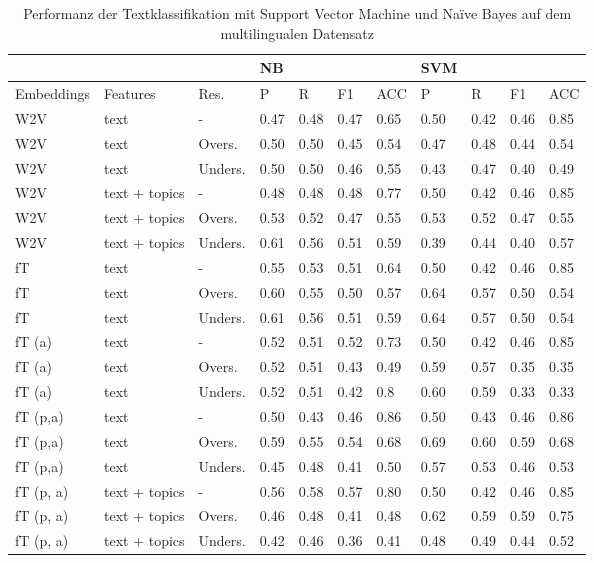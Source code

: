 \documentclass[ngerman]{ttlab-qualify}
\begin{document}
\newpage
\begin{table}[!ht]
    \centering
    \caption{Performanz der Textklassifikation mit Support Vector Machine und Naïve Bayes auf dem multilingualen Datensatz}
    \begin{tabular}{|l|l|l|l|l|l|l|l|l|l|l|}
    \hline
        \textbf{} & \textbf{} & \textbf{} & \textbf{NB} & \textbf{} & \textbf{} & \textbf{} & \textbf{SVM} & \textbf{} & \textbf{} & \textbf{} \\ \hline
        Embeddings & Features & Res. & P & R & F1 & ACC & P & R & F1 & ACC \\ \hline
        W2V  & text  &   - & 0.47 & 0.48 & 0.47 & 0.65 & 0.50 & 0.42 & 0.46 & 0.85 \\ \hline
        W2V  & text  & Overs. & 0.50 & 0.50 & 0.45 & 0.54 & 0.47 & 0.48 & 0.44 & 0.54 \\ \hline
        W2V  & text  & Unders. & 0.50 & 0.50 & 0.46 & 0.55 & 0.43 & 0.47 & 0.40 & 0.49 \\ \hline
        W2V  & text + topics &   - & 0.48 & 0.48 & 0.48 & 0.77 & 0.50 & 0.42 & 0.46 & 0.85 \\ \hline
        W2V  & text + topics & Overs. & 0.53 & 0.52 & 0.47 & 0.55 & 0.53 & 0.52 & 0.47 & 0.55 \\ \hline
        W2V   & text + topics & Unders. & 0.61 & 0.56 & 0.51 & 0.59 & 0.39 & 0.44 & 0.40 & 0.57 \\ \hline
        fT  & text  &   - & 0.55 & 0.53 & 0.51 & 0.64 & 0.50 & 0.42 & 0.46 & 0.85 \\ \hline
        fT  & text  & Overs. & 0.60 & 0.55 & 0.50 & 0.57 & 0.64 & 0.57 & 0.50 & 0.54 \\ \hline
        fT  & text  & Unders. & 0.61 & 0.56 & 0.51 & 0.59 & 0.64 & 0.57 & 0.50 & 0.54 \\ \hline
        fT (a) & text  &   - & 0.52 & 0.51 & 0.52 & 0.73 & 0.50 & 0.42 & 0.46 & 0.85 \\ \hline
        fT  (a) & text  & Overs. & 0.52 & 0.51 & 0.43 & 0.49 & 0.59 & 0.57 & 0.35 & 0.35 \\ \hline
        fT  (a) & text  & Unders. & 0.52 & 0.51 & 0.42 & 0.8 & 0.60 & 0.59 & 0.33 & 0.33 \\ \hline
        fT (p,a) & text  &   - & 0.50 & 0.43 & 0.46 & 0.86 & 0.50 & 0.43 & 0.46 & 0.86 \\ \hline
        fT (p,a) & text  & Overs. & 0.59 & 0.55 & 0.54 & 0.68 & 0.69 & 0.60 & 0.59 & 0.68 \\ \hline
        fT (p,a) & text  & Unders. & 0.45 & 0.48 & 0.41 & 0.50 & 0.57 & 0.53 & 0.46 & 0.53 \\ \hline
        fT (p, a) & text + topics &  - & 0.56 & 0.58 & 0.57 & 0.80 & 0.50 & 0.42 & 0.46 & 0.85 \\ \hline
        fT (p, a) & text + topics & Overs. & 0.46 & 0.48 & 0.41 & 0.48 & 0.62 & 0.59 & 0.59 & 0.75 \\ \hline
        fT (p, a) & text + topics & Unders. & 0.42 & 0.46 & 0.36 & 0.41 & 0.48 & 0.49 & 0.44 & 0.52 \\ \hline
    \end{tabular}
\end{table}
\end{document}
